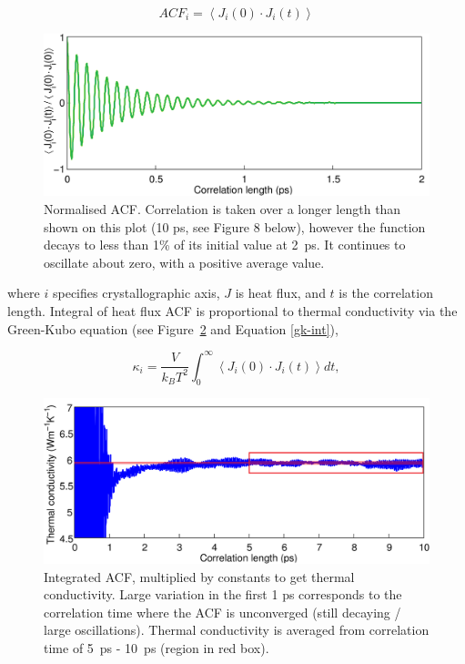 \documentclass[%
preprint,                                  %
nofootinbib,
 amsmath,amssymb,
 aps,
]{revtex4-1}
\begin{document}
\begin{equation}
ACF_i = \left \langle J_i(0) \cdot  J_i(t) \right \rangle
\label{acf-j}
\end{equation}

\begin{figure}[h]
  \includegraphics[width=\linewidth]{images/gk_acf.png}
  \caption{Normalised ACF. Correlation is taken over a longer length than shown on this plot (10 ps, see Figure 8 below), however the function decays to less than 1\% of its initial value at 2~ps. It continues to oscillate about zero, with a positive average value.}
  \label{fig:gk_acf}
\end{figure}

where $i$ specifies crystallographic axis, $J$ is heat flux, and $t$ is the correlation length. Integral of heat flux ACF is proportional to thermal conductivity via the Green-Kubo equation (see Figure~\ref{fig:gk_int} and Equation \ref{gk-int}), 

\begin{equation}
\kappa_i = \frac{V}{k_{B}T^2} \int_{0}^{\infty} \left \langle J_i(0) \cdot  J_i(t) \right \rangle dt ,
\label{gk-int}
\end{equation}

\begin{figure}[h]
  \includegraphics[width=\linewidth]{images/gk_int.png}
  \caption{Integrated ACF, multiplied by constants to get thermal conductivity. Large variation in the first 1 ps corresponds to the correlation time where the ACF is unconverged (still decaying / large oscillations). Thermal conductivity is averaged from correlation time of 5~ps - 10~ps (region in red box).}
  \label{fig:gk_int}
\end{figure}
\end{document}
